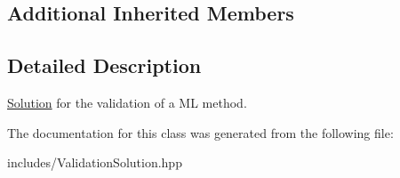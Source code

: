 \subsection*{Additional Inherited Members}


\subsection{Detailed Description}
\hyperlink{class_solution}{Solution} for the validation of a ML method. 

The documentation for this class was generated from the following file\+:\begin{DoxyCompactItemize}
\item 
includes/Validation\+Solution.\+hpp\end{DoxyCompactItemize}
